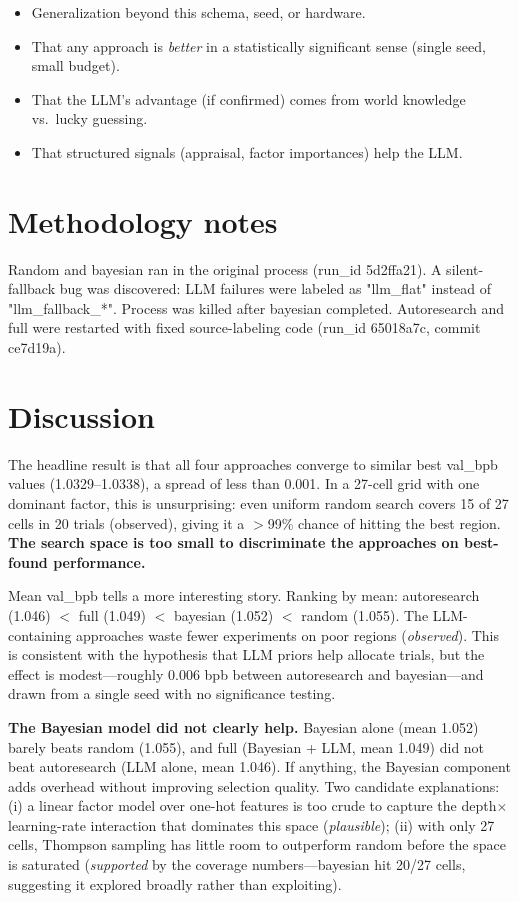 \documentclass[10pt,a4paper,twocolumn]{article}
\begin{document}
    \begin{itemize}
    \item Generalization beyond this schema, seed, or hardware.
    \item That any approach is \emph{better} in a statistically significant sense
          (single seed, small budget).
    \item That the LLM's advantage (if confirmed) comes from world knowledge vs.\ lucky guessing.
    \item That structured signals (appraisal, factor importances) help the LLM.
    \end{itemize}

    \section{Methodology notes}

    Random and bayesian ran in the original process (run\_id 5d2ffa21). A silent-fallback
bug was discovered: LLM failures were labeled as "llm\_flat" instead of "llm\_fallback\_*".
Process was killed after bayesian completed. Autoresearch and full were restarted
with fixed source-labeling code (run\_id 65018a7c, commit ce7d19a).


    \section{Discussion}
    The headline result is that all four approaches converge to similar best val\_bpb values (1.0329--1.0338), a spread of less than 0.001. In a 27-cell grid with one dominant factor, this is unsurprising: even uniform random search covers 15 of 27 cells in 20 trials (observed), giving it a $>$99\% chance of hitting the best region. \textbf{The search space is too small to discriminate the approaches on best-found performance.}

Mean val\_bpb tells a more interesting story. Ranking by mean: autoresearch (1.046) $<$ full (1.049) $<$ bayesian (1.052) $<$ random (1.055). The LLM-containing approaches waste fewer experiments on poor regions (\emph{observed}). This is consistent with the hypothesis that LLM priors help allocate trials, but the effect is modest---roughly 0.006 bpb between autoresearch and bayesian---and drawn from a single seed with no significance testing.

\textbf{The Bayesian model did not clearly help.} Bayesian alone (mean 1.052) barely beats random (1.055), and full (Bayesian + LLM, mean 1.049) did not beat autoresearch (LLM alone, mean 1.046). If anything, the Bayesian component adds overhead without improving selection quality. Two candidate explanations: (i) a linear factor model over one-hot features is too crude to capture the depth$\times$learning-rate interaction that dominates this space (\emph{plausible}); (ii) with only 27 cells, Thompson sampling has little room to outperform random before the space is saturated (\emph{supported} by the coverage numbers---bayesian hit 20/27 cells, suggesting it explored broadly rather than exploiting).
\end{document}
